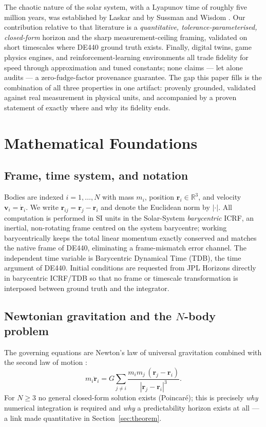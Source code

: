 \documentclass[11pt]{article}
\theoremstyle{definition}
\begin{document}
The chaotic nature of the solar system, with a Lyapunov time of roughly five
million years, was established by Laskar \cite{laskar1989} and by Sussman and
Wisdom \cite{sussmanwisdom1992}. Our contribution relative to that literature is
a \emph{quantitative, tolerance-parameterised, closed-form} horizon and the
sharp measurement-ceiling framing, validated on short timescales where DE440
ground truth exists. Finally, digital twins, game physics engines, and
reinforcement-learning environments all trade fidelity for speed through
approximation and tuned constants; none claims --- let alone audits --- a
zero-fudge-factor provenance guarantee. The gap this paper fills is the
combination of all three properties in one artifact: provenly grounded,
validated against real measurement in physical units, and accompanied by a
proven statement of exactly where and why its fidelity ends.

\section{Mathematical Foundations}
\label{sec:foundations}

\subsection{Frame, time system, and notation}
Bodies are indexed $i = 1,\dots,N$ with mass $m_i$, position
$\mathbf r_i \in \mathbb R^3$, and velocity $\mathbf v_i = \dot{\mathbf r}_i$.
We write $\mathbf r_{ij} = \mathbf r_j - \mathbf r_i$ and denote the Euclidean
norm by $|\cdot|$. All computation is performed in SI units in the
Solar-System \emph{barycentric} ICRF, an inertial, non-rotating frame centred on
the system barycentre; working barycentrically keeps the total linear momentum
exactly conserved and matches the native frame of DE440, eliminating a
frame-mismatch error channel. The independent time variable is Barycentric
Dynamical Time (TDB), the time argument of DE440. Initial conditions are
requested from JPL Horizons directly in barycentric ICRF/TDB so that no frame or
timescale transformation is interposed between ground truth and the integrator.

\subsection{Newtonian gravitation and the $N$-body problem}
The governing equations are Newton's law of universal gravitation combined with
the second law of motion \cite{newton1687}:
\begin{equation}
\label{eq:nbody}
m_i \ddot{\mathbf r}_i
= G \sum_{j \neq i} \frac{m_i m_j\,(\mathbf r_j - \mathbf r_i)}
{|\mathbf r_j - \mathbf r_i|^{3}}.
\end{equation}
For $N \ge 3$ no general closed-form solution exists (Poincar\'e); this is
precisely \emph{why} numerical integration is required and \emph{why} a
predictability horizon exists at all --- a link made quantitative in
Section~\ref{sec:theorem}.
\end{document}
